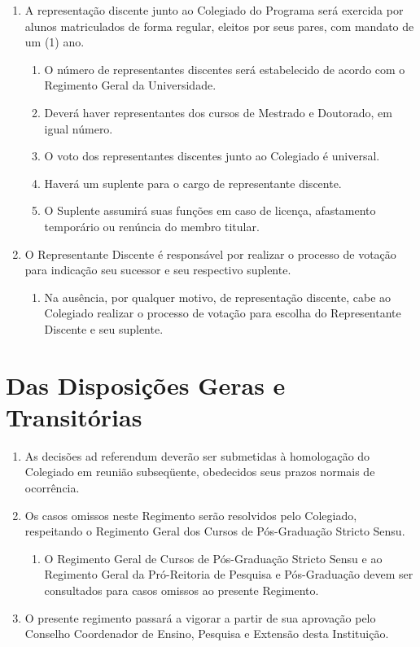 \documentclass{article}
\newcommand{\singleitem}{\item[Parágrafo Único.]}
\begin{document}
\begin{enumerate}
	\item A representação discente junto ao Colegiado do Programa será exercida por alunos matriculados de forma regular, eleitos por seus pares, com mandato de um (1) ano.
	\begin{enumerate}
		\item O número de representantes discentes será estabelecido de acordo com o Regimento Geral da Universidade.
		\item Deverá haver representantes dos cursos de Mestrado e Doutorado, em igual número.
		\item O voto dos representantes discentes junto ao Colegiado é universal.
		\item Haverá um suplente para o cargo de representante discente.
		\item O Suplente assumirá suas funções em caso de licença, afastamento temporário ou renúncia do membro titular.
	\end{enumerate}
	\item O Representante Discente é responsável por realizar o processo de votação para indicação seu sucessor e seu respectivo suplente.
	\begin{enumerate}
		\singleitem Na ausência, por qualquer motivo, de representação discente, cabe ao Colegiado realizar o processo de votação para escolha do Representante Discente e seu suplente.
	\end{enumerate}
\end{enumerate}

\section{Das Disposições Geras e Transitórias}

\begin{enumerate}
	\item As decisões ad referendum deverão ser submetidas à homologação do Colegiado em reunião subseqüente, obedecidos seus prazos normais de ocorrência.
	\item Os casos omissos neste Regimento serão resolvidos pelo Colegiado, respeitando o Regimento Geral dos Cursos de Pós-Graduação Stricto Sensu.
	\begin{enumerate}
		\singleitem O Regimento Geral de Cursos de Pós-Graduação Stricto Sensu e ao Regimento Geral da Pró-Reitoria de Pesquisa e Pós-Graduação devem ser consultados para casos omissos ao presente Regimento. 
	\end{enumerate}
	\item  O presente regimento passará a vigorar a partir de sua aprovação pelo Conselho Coordenador de Ensino, Pesquisa e Extensão desta Instituição.

\end{enumerate}
\end{document}
